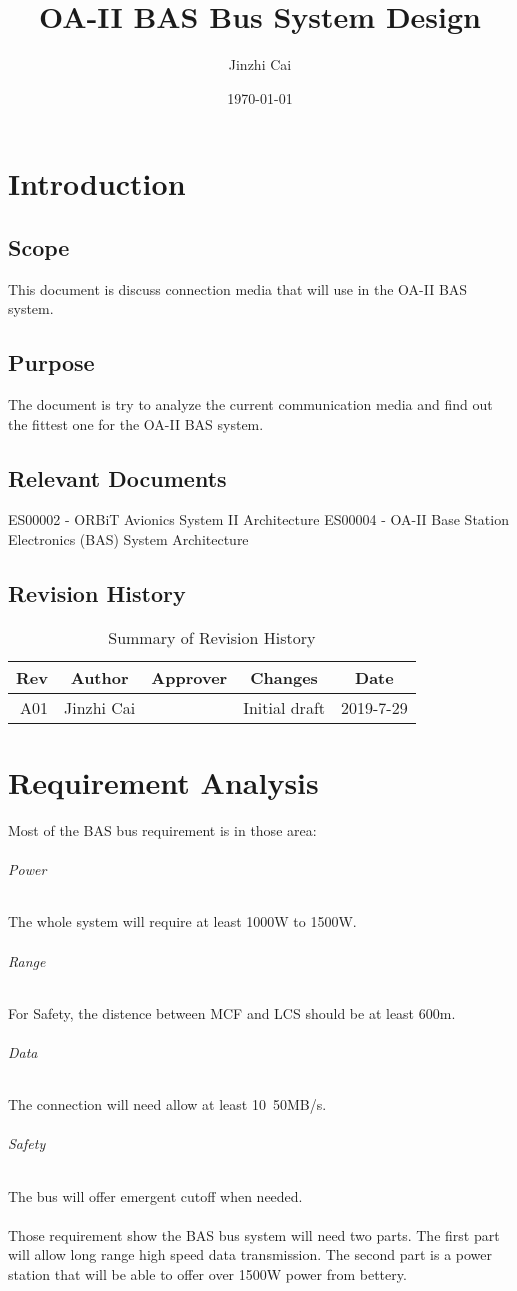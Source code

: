 \documentclass[12pt,article]{memoir}
\title{OA-II BAS Bus System Design}
\author{Jinzhi Cai}
\date{\today}
\begin{document}
	


\tableofcontents*
\clearpage


\chapter{Introduction}
\section{Scope}
This document is discuss connection media that will use in the OA-II BAS system.
\section{Purpose}
The document is try to analyze the current communication media and find out the fittest one for the OA-II BAS system.
\section{Relevant Documents}
ES00002 - ORBiT Avionics System II Architecture
ES00004 - OA-II Base Station Electronics (BAS) System Architecture
\section{Revision History}
\begin{table}[H]
	\centering
	\begin{tabu}{r || c | c | c | c }
		Rev & Author & Approver & Changes & Date\\ \hline
		A01 & Jinzhi Cai & & Initial draft & 2019-7-29 \\
	\end{tabu}
	\caption{Summary of Revision History}
	\label{tab:rev}
\end{table}
\newpage
\chapter{Requirement Analysis}
Most of the BAS bus requirement is in those area:
\subparagraph{Power} The whole system will require at least 1000W to 1500W.
\subparagraph{Range} For Safety, the distence between MCF and LCS should be at least 600m.
\subparagraph{Data} The connection will need allow at least 10~50MB/s.
\subparagraph{Safety} The bus will offer emergent cutoff when needed.\\\\
Those requirement show the BAS bus system will need two parts. The first part will allow long range high speed data transmission. The second part is a power station that will be able to offer over 1500W power from bettery.
\newpage
\end{document}
